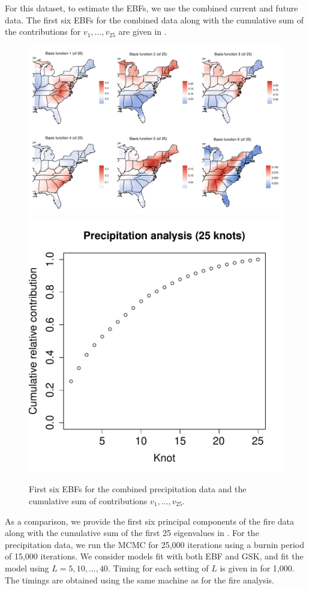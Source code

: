 \documentclass[11pt]{article}
\begin{document}
For this dataset, to estimate the EBFs, we use the combined current and future data.
The first six EBFs for the combined data along with the cumulative sum of the contributions for $v_1, \ldots, v_{25}$ are given in .
\begin{figure}[htbp]  %
  \centering
  \includegraphics[width=\linewidth]{plots/precip-ebf-panel.pdf}\\
  \includegraphics[width=0.35\linewidth]{plots/precipv-25.pdf}
  \caption{First six EBFs for the combined precipitation data and the cumulative sum of contributions $v_1, \ldots, v_{25}$.}
  \label{ebfig:precip-ebfpanel}
\end{figure}
As a comparison, we provide the first six principal components of the fire data along with the cumulative sum of the first 25 eigenvalues in .
For the precipitation data, we run the MCMC for 25,000 iterations using a burnin period of 15,000 iterations.
We consider models fit with both EBF and GSK, and fit the model using $L = 5, 10, \ldots, 40$.
Timing for each setting of $L$ is given in  for 1,000.
The timings are obtained using the same machine as for the fire analysis.
\end{document}
